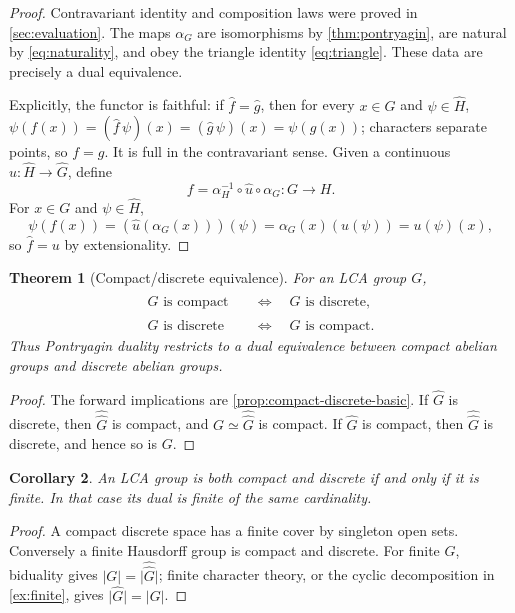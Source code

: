 \documentclass[11pt]{article}
\newtheorem{theorem}{Theorem}[section]
\newtheorem{corollary}[theorem]{Corollary}
\theoremstyle{definition}
\theoremstyle{remark}
\newcommand{\dual}[1]{\widehat{#1}}
\newcommand{\bidual}[1]{\widehat{\widehat{#1}}}
\newcommand{\abs}[1]{\lvert #1\rvert}
\begin{document}
\begin{proof}
Contravariant identity and composition laws were proved in
\cref{sec:evaluation}.  The maps $\alpha_G$ are isomorphisms by
\cref{thm:pontryagin}, are natural by \eqref{eq:naturality}, and obey the triangle
identity \eqref{eq:triangle}.  These data are precisely a dual equivalence.

Explicitly, the functor is faithful: if $\dual f=\dual g$, then for every $x\in G$ and
$\psi\in\dual H$,
$\psi(f(x))=(\dual f\,\psi)(x)=(\dual g\,\psi)(x)=\psi(g(x))$; characters separate
points, so $f=g$.  It is full in the contravariant sense.  Given a continuous
$u:\dual H\to\dual G$, define
\begin{equation}
 f=\alpha_H^{-1}\circ\dual u\circ\alpha_G:G\longrightarrow H.
 \label{eq:recover-map-from-dual}
\end{equation}
For $x\in G$ and $\psi\in\dual H$,
\[
 \psi(f(x))=(\dual u(\alpha_G(x)))(\psi)
 =\alpha_G(x)(u(\psi))=u(\psi)(x),
\]
so $\dual f=u$ by extensionality.
\end{proof}

\begin{theorem}[Compact/discrete equivalence]
\label{thm:compact-discrete-iff}
For an LCA group $G$,
\begin{align*}
 G\text{ is compact}&\quad\Longleftrightarrow\quad\dual G\text{ is discrete},\\
 G\text{ is discrete}&\quad\Longleftrightarrow\quad\dual G\text{ is compact}.
\end{align*}
Thus Pontryagin duality restricts to a dual equivalence between compact abelian groups
and discrete abelian groups.
\end{theorem}

\begin{proof}
The forward implications are \cref{prop:compact-discrete-basic}.  If $\dual G$ is
discrete, then $\bidual G$ is compact, and $G\simeq\bidual G$ is compact.  If
$\dual G$ is compact, then $\bidual G$ is discrete, and hence so is $G$.
\end{proof}

\begin{corollary}
An LCA group is both compact and discrete if and only if it is finite.  In that case its
dual is finite of the same cardinality.
\end{corollary}

\begin{proof}
A compact discrete space has a finite cover by singleton open sets.  Conversely a finite
Hausdorff group is compact and discrete.  For finite $G$, biduality gives
$\abs G=\abs{\bidual G}$; finite character theory, or the cyclic decomposition in
\cref{ex:finite}, gives $\abs{\dual G}=\abs G$.
\end{proof}
\end{document}
